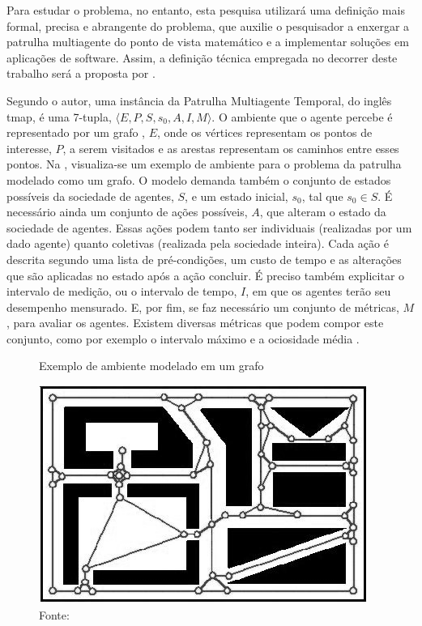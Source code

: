 Para estudar o problema, no entanto, esta pesquisa utilizará uma definição mais 
formal, precisa e abrangente do problema, que auxilie o pesquisador a enxergar 
a patrulha multiagente do ponto de vista matemático e a implementar soluções em 
aplicações de software. Assim, a definição técnica empregada no decorrer deste 
trabalho será a proposta por \citep{sampaiophd}.

Segundo o autor, uma instância da Patrulha Multiagente Temporal, do inglês 
\ac{tmap}, é uma 7-tupla, $ \langle E, P, S, s_{0}, A, I, M \rangle $. O 
ambiente que o agente percebe é representado por um grafo 
\citep{Rosen:2002:DMA:579402}, $E$, onde os vértices representam os pontos de 
interesse, $P$, a serem visitados e as arestas representam os caminhos entre 
esses pontos. Na , visualiza-se um exemplo de ambiente 
para o problema da patrulha modelado como um grafo. O modelo demanda também o 
conjunto de estados possíveis da sociedade de agentes, $S$, e um estado inicial, 
$ s_{0} $, tal que $ s_{0} \in S $. É necessário ainda um conjunto de ações 
possíveis, $A$, que alteram o estado da sociedade de agentes. Essas ações podem 
tanto ser individuais (realizadas por um dado agente) quanto coletivas 
(realizada pela sociedade inteira). Cada ação é descrita segundo uma lista de 
pré-condições, um custo de tempo e as alterações que são aplicadas no estado 
após a ação concluir. É preciso também explicitar o intervalo de medição, ou o 
intervalo de tempo, $I$, em que os agentes terão seu desempenho mensurado. E, 
por fim, se faz necessário um conjunto de métricas, $M$, para avaliar os 
agentes. Existem diversas métricas que podem compor este conjunto, como por 
exemplo o intervalo máximo \citep{Chevaleyre:2004:TAM:1018411.1019013} e 
a ociosidade média \citep{hernandez2013game}.

\begin{figure}[tp]
	\caption[Exemplo de ambiente modelado em um grafo]{Exemplo de ambiente 
		modelado em um grafo}
	\centering
	\includegraphics[width=0.75\columnwidth]{images/grafoExemplo.png}
	\caption*{Fonte: \citep{machado2002b}}
	\label{fig:graphexample}
\end{figure}

